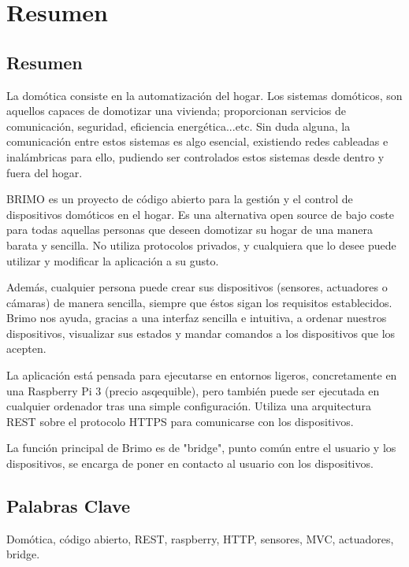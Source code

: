 \chapter*{Resumen}

\section*{Resumen}

La domótica consiste en la automatización del hogar. Los sistemas domóticos, son aquellos capaces de domotizar una vivienda; proporcionan servicios de comunicación,
seguridad, eficiencia energética...etc. Sin duda alguna, la comunicación entre estos sistemas es algo esencial, existiendo redes cableadas e inalámbricas para ello, pudiendo
ser controlados estos sistemas desde dentro y fuera del hogar.

BRIMO es un proyecto de código abierto para la gestión y el control de dispositivos domóticos en el hogar. Es una alternativa open source de bajo coste para todas
aquellas personas que deseen domotizar su hogar de una manera barata y sencilla. No utiliza protocolos privados, y cualquiera que lo desee puede utilizar y modificar
la aplicación a su gusto.

Además, cualquier persona puede crear sus dispositivos (sensores, actuadores o cámaras) de manera sencilla, siempre que éstos sigan los requisitos establecidos.
Brimo nos ayuda, gracias a una interfaz sencilla e intuitiva, a ordenar nuestros dispositivos, visualizar sus estados y mandar comandos a los dispositivos que los acepten.

La aplicación está pensada para ejecutarse en entornos ligeros, concretamente en una Raspberry Pi 3 (precio asqequible), pero también puede ser ejecutada en cualquier ordenador tras una simple configuración.
Utiliza una arquitectura REST sobre el protocolo HTTPS para comunicarse con los dispositivos.

La función principal de Brimo es de "bridge", punto común entre el usuario y los dispositivos, se encarga de poner en contacto al usuario con los dispositivos.
\section*{Palabras Clave}
Domótica, código abierto, REST, raspberry, HTTP, sensores, MVC, actuadores, bridge.
\newpage


